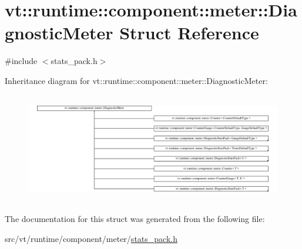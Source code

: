 \hypertarget{structvt_1_1runtime_1_1component_1_1meter_1_1_diagnostic_meter}{}\section{vt\+:\+:runtime\+:\+:component\+:\+:meter\+:\+:Diagnostic\+Meter Struct Reference}
\label{structvt_1_1runtime_1_1component_1_1meter_1_1_diagnostic_meter}


{\ttfamily \#include $<$stats\+\_\+pack.\+h$>$}

Inheritance diagram for vt\+:\+:runtime\+:\+:component\+:\+:meter\+:\+:Diagnostic\+Meter\+:\begin{figure}[H]
\begin{center}
\leavevmode
\includegraphics[height=4.846154cm]{structvt_1_1runtime_1_1component_1_1meter_1_1_diagnostic_meter}
\end{center}
\end{figure}


The documentation for this struct was generated from the following file\+:\begin{DoxyCompactItemize}
\item 
src/vt/runtime/component/meter/\hyperlink{stats__pack_8h}{stats\+\_\+pack.\+h}\end{DoxyCompactItemize}
